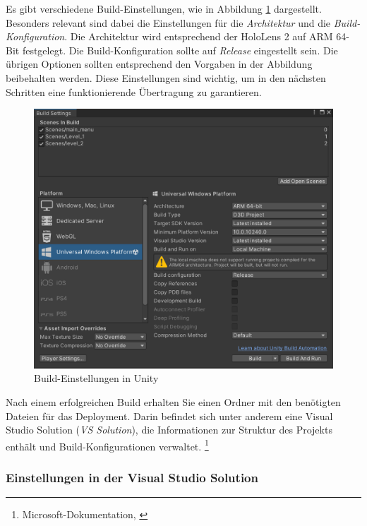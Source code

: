 Es gibt verschiedene Build-Einstellungen, wie in Abbildung \ref{fig:build-settings} dargestellt. Besonders relevant sind dabei die Einstellungen für die \textit{Architektur} und die \textit{Build-Konfiguration}. Die Architektur wird entsprechend der HoloLens 2 auf ARM 64-Bit festgelegt. Die Build-Konfiguration sollte auf \textit{Release} eingestellt sein. Die übrigen Optionen sollten entsprechend den Vorgaben in der Abbildung beibehalten werden. Diese Einstellungen sind wichtig, um in den nächsten Schritten eine funktionierende Übertragung zu garantieren.

\begin{figure}[H]
    \centering
    \includegraphics[scale=0.6]{images/build}
    \caption{Build-Einstellungen in Unity}
    \label{fig:build-settings}
\end{figure}

Nach einem erfolgreichen Build erhalten Sie einen Ordner mit den benötigten Dateien für das Deployment. Darin befindet sich unter anderem eine Visual Studio Solution (\textit{VS Solution}), die Informationen zur Struktur des Projekts enthält und Build-Konfigurationen verwaltet. \footnote{Microsoft-Dokumentation, \cite{Visual Studio Solution}}

\subsubsection*{Einstellungen in der Visual Studio Solution}

